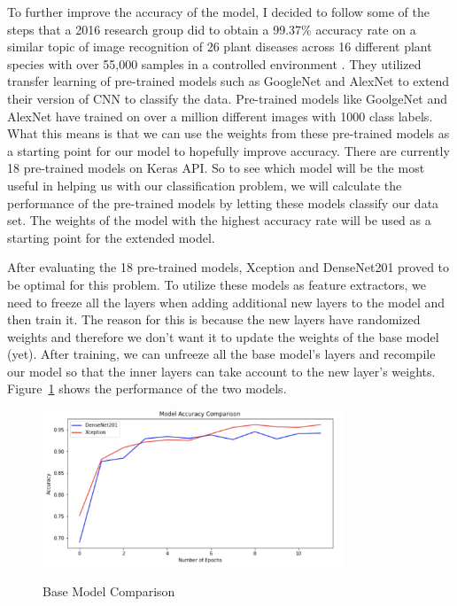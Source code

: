\documentclass[man,floatsintext]{apa7}
\begin{document}
\begin{singlespace}
To further improve the accuracy of the model, I decided to follow some of the steps that a 2016 research group did to obtain a 99.37$\%$ accuracy rate on a similar topic of image recognition of 26 plant diseases across 16 different plant species with over 55,000 samples in a controlled environment \parencite{frontiers}. They utilized transfer learning of pre-trained models such as GoogleNet and AlexNet to extend their version of CNN to classify the data. Pre-trained models like GoolgeNet and AlexNet have trained on over a million different images with 1000 class labels. What this means is that we can use the weights from these pre-trained models as a starting point for our model to hopefully improve accuracy. There are currently 18 pre-trained models on Keras API. So to see which model will be the most useful in helping us with our classification problem, we will calculate the performance of the pre-trained models by letting these models classify our data set. The weights of the model with the highest accuracy rate will be used as a starting point for the extended model.

After evaluating the 18 pre-trained models, Xception and DenseNet201 proved to be optimal for this problem. To utilize these models as feature extractors, we need to freeze all the layers when adding additional new layers to the model and then train it. The reason for this is because the new layers have randomized weights and therefore we don’t want it to update the weights of the base model (yet). After training, we can unfreeze all the base model’s layers and recompile our model so that the inner layers can take account to the new layer’s weights. Figure~\ref{fig:Figure6} shows the performance of the two models.
\clearpage

\begin{figure}
  \centering
  \caption{Base Model Comparison}
  \includegraphics[width=0.8\textwidth]{images/image7.jpg}
  \label{fig:Figure6}
\end{figure}



\end{singlespace}
\end{document}
